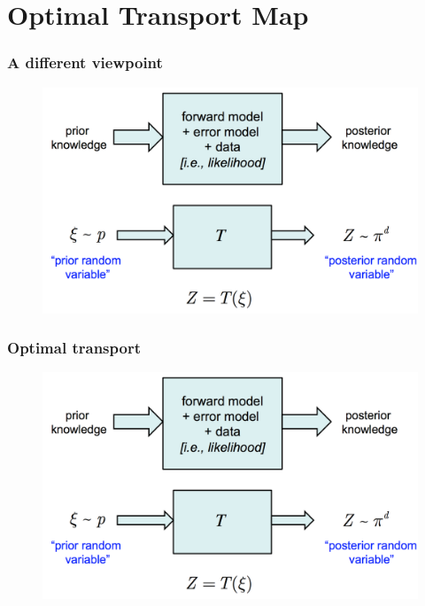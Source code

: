 \documentclass[table]{beamer}
\begin{document}
\begin{CJK}{UTF8}{gbsn}
\begin{frame}
\end{frame}

\section{Optimal Transport Map}

\begin{frame}
  \frametitle{A different viewpoint}

\begin{figure}
\includegraphics[scale=0.2]{img/viewpoint.png}
\end{figure}
\end{frame}

\begin{frame}
  \frametitle{Optimal transport}

\begin{figure}
\includegraphics[scale=0.2]{img/viewpoint.png}
\end{figure}
\end{frame}


\end{CJK}
\end{document}
